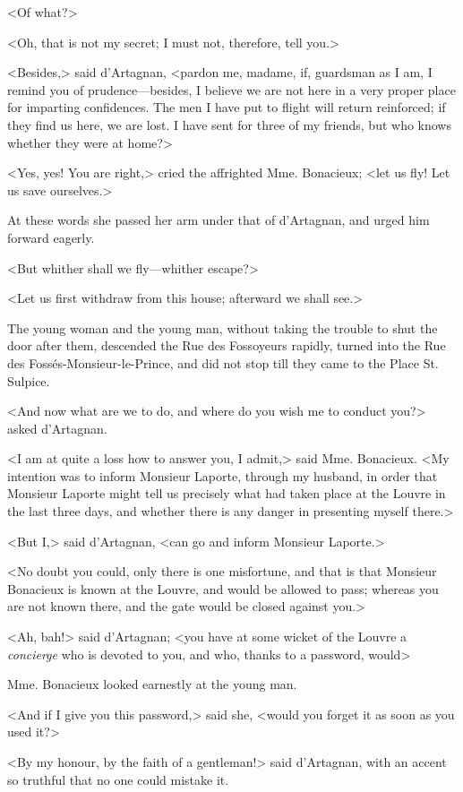 <Of what?> 

<Oh, that is not my secret; I must not, therefore, tell you.> 

<Besides,> said d'Artagnan, <pardon me, madame, if, guardsman as I am, I remind you of prudence---besides, I believe we are not here in a very proper place for imparting confidences. The men I have put to flight will return reinforced; if they find us here, we are lost. I have sent for three of my friends, but who knows whether they were at home?> 

<Yes, yes! You are right,> cried the affrighted Mme. Bonacieux; <let us fly! Let us save ourselves.> 

At these words she passed her arm under that of d'Artagnan, and urged him forward eagerly. 

<But whither shall we fly---whither escape?> 

<Let us first withdraw from this house; afterward we shall see.> 

The young woman and the young man, without taking the trouble to shut the door after them, descended the Rue des Fossoyeurs rapidly, turned into the Rue des Fossés-Monsieur-le-Prince, and did not stop till they came to the Place St. Sulpice. 

<And now what are we to do, and where do you wish me to conduct you?> asked d'Artagnan. 

<I am at quite a loss how to answer you, I admit,> said Mme. Bonacieux. <My intention was to inform Monsieur Laporte, through my husband, in order that Monsieur Laporte might tell us precisely what had taken place at the Louvre in the last three days, and whether there is any danger in presenting myself there.> 

<But I,> said d'Artagnan, <can go and inform Monsieur Laporte.> 

<No doubt you could, only there is one misfortune, and that is that Monsieur Bonacieux is known at the Louvre, and would be allowed to pass; whereas you are not known there, and the gate would be closed against you.> 

<Ah, bah!> said d'Artagnan; <you have at some wicket of the Louvre a \textit{concierge} who is devoted to you, and who, thanks to a password, would\longdash> 

Mme. Bonacieux looked earnestly at the young man. 

<And if I give you this password,> said she, <would you forget it as soon as you used it?> 

<By my honour, by the faith of a gentleman!> said d'Artagnan, with an accent so truthful that no one could mistake it. 

